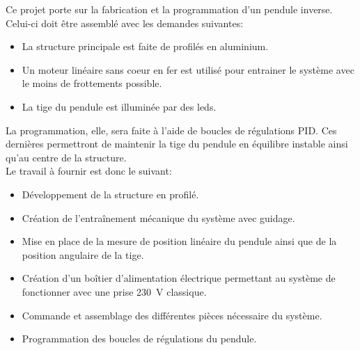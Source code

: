 Ce projet porte sur la fabrication et la programmation d'un pendule inverse. Celui-ci doit être assemblé avec les demandes
suivantes:
\begin{itemize}
    \item La structure principale est faite de profilés en aluminium.
    \item Un moteur linéaire sans coeur en fer est utilisé pour entrainer le système avec le moins de frottements possible.
    \item La tige du pendule est illuminée par des leds.
\end{itemize}

La programmation, elle, sera faite à l'aide de boucles de régulations \gls{PID}. Ces dernières permettront de maintenir la tige du pendule
en équilibre instable ainsi qu'au centre de la structure.\\

Le travail à fournir est donc le suivant:
\begin{itemize}
    \item Développement de la structure en profilé.
    \item Création de l'entraînement mécanique du système avec guidage.
    \item Mise en place de la mesure de position linéaire du pendule ainsi que de la position angulaire de la tige.
    \item Création d'un boîtier d'alimentation électrique permettant au système de fonctionner avec une prise 230~V classique.
    \item Commande et assemblage des différentes pièces nécessaire du système.
    \item Programmation des boucles de régulations du pendule.
\end{itemize}